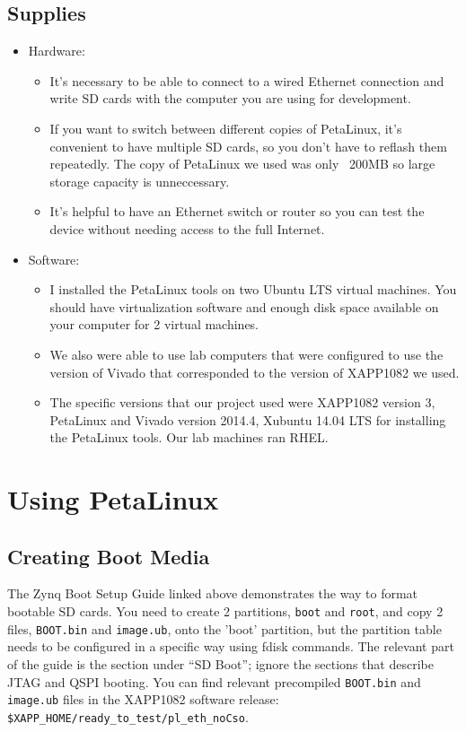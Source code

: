 \documentclass[12pt]{report}
\begin{document}
\subsection{Supplies}
\begin{itemize}
  \item Hardware: 
    \begin{itemize}
    \item It's necessary to be able to connect to a wired Ethernet connection and write SD cards with the computer you are using for development.
    \item If you want to switch between different copies of PetaLinux, it's convenient to have multiple SD cards, so you don't have to reflash them repeatedly. The copy of PetaLinux we used was only ~200MB so large storage capacity is unneccessary.
    \item It's helpful to have an Ethernet switch or router so you can test the device without needing access to the full Internet.
    \end{itemize}
  \item Software:
    \begin{itemize}
    \item I installed the PetaLinux tools on two Ubuntu LTS virtual machines. You should have virtualization software and enough disk space available on your computer for 2 virtual machines.
    \item We also were able to use lab computers that were configured to use the version of Vivado that corresponded to the version of XAPP1082 we used.
    \item The specific versions that our project used were XAPP1082 version 3, PetaLinux and Vivado version 2014.4, Xubuntu 14.04 LTS for installing the PetaLinux tools. Our lab machines ran RHEL.
    \end{itemize}
\end{itemize}

\section{Using PetaLinux}
\subsection{Creating Boot Media}
The Zynq Boot Setup Guide linked above demonstrates the way to format bootable SD cards. You need to create 2 partitions, \texttt{boot} and \texttt{root}, and copy 2 files, \texttt{BOOT.bin} and \texttt{image.ub}, onto the 'boot' partition, but the partition table needs to be configured in a specific way using fdisk commands. The relevant part of the guide is the section under ``SD Boot''; ignore the sections that describe JTAG and QSPI booting. You can find relevant precompiled \texttt{BOOT.bin} and \texttt{image.ub} files in the XAPP1082 software release: \texttt{\$XAPP\_HOME/ready\_to\_test/pl\_eth\_noCso}.
\end{document}
